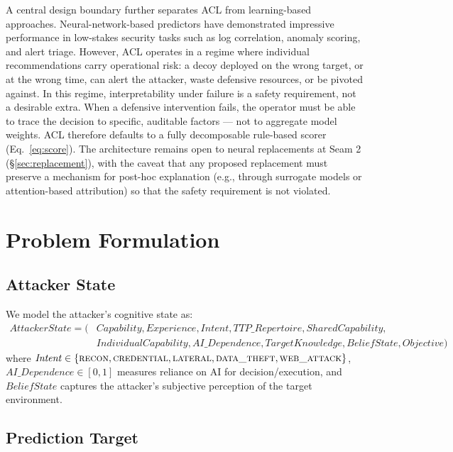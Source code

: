 \documentclass[11pt]{article}
\newcommand{\intent}[1]{\textsc{#1}}
\begin{document}
A central design boundary further separates ACL from learning-based approaches. Neural-network-based predictors have demonstrated impressive performance in low-stakes security tasks such as log correlation, anomaly scoring, and alert triage. However, ACL operates in a regime where individual recommendations carry operational risk: a decoy deployed on the wrong target, or at the wrong time, can alert the attacker, waste defensive resources, or be pivoted against. In this regime, interpretability under failure is a safety requirement, not a desirable extra. When a defensive intervention fails, the operator must be able to trace the decision to specific, auditable factors --- not to aggregate model weights. ACL therefore defaults to a fully decomposable rule-based scorer (Eq.~\ref{eq:score}). The architecture remains open to neural replacements at Seam 2 (\S\ref{sec:replacement}), with the caveat that any proposed replacement must preserve a mechanism for post-hoc explanation (e.g., through surrogate models or attention-based attribution) so that the safety requirement is not violated.

\section{Problem Formulation}
\label{sec:problem}

\subsection{Attacker State}
\label{sec:state}

We model the attacker's cognitive state as:
\[
\begin{aligned}
\mathit{AttackerState} = (&\mathit{Capability},\mathit{Experience},\mathit{Intent},
\mathit{TTP\_Repertoire},\mathit{SharedCapability},\\
&\mathit{IndividualCapability},\mathit{AI\_Dependence},\mathit{TargetKnowledge},
\mathit{BeliefState},\mathit{Objective})
\end{aligned}
\]
where $\mathit{Intent} \in \{\intent{recon}, \intent{credential},
\intent{lateral}, \intent{data\_theft}, \intent{web\_attack}\}$,
$\mathit{AI\_Dependence} \in [0,1]$ measures reliance on AI for
decision/execution, and $\mathit{BeliefState}$ captures the attacker's
subjective perception of the target environment.

\subsection{Prediction Target}
\label{sec:prediction-target}
\end{document}
